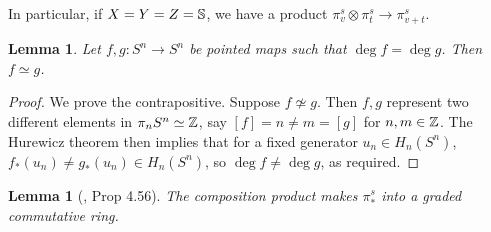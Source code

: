 \documentclass[11pt, titlepage]{article} %
\def\bb{\ensuremath\mathbb}
\def\inte{\ensuremath\mathbb{Z}}
\numberwithin{equation}{subsection}
\theoremstyle{plain}
\newtheorem{lemma}[theorem]{Lemma}
\theoremstyle{definition}
\begin{document}
In particular, if \(X=Y=Z=\bb{S}\), we have a product \(\pi_v^s\otimes \pi_t^s\to \pi_{v+t}^s\).

\begin{lemma}\label{2504281107}
Let \(f, g : S^n \to S^n\) be pointed maps such that \(\deg f = \deg g\). Then \(f \simeq g\). 
\end{lemma}

\begin{proof}
We prove the contrapositive. Suppose \(f \not\simeq g\). Then \(f, g\) represent two different elements in \(\pi_nS^n \simeq \inte\), say \([f]=n\neq m=[g]\) for \(n, m \in \inte\). The Hurewicz theorem then implies that for a fixed generator \(u_n \in H_n(S^n)\), \(f_*(u_n)\neq g_*(u_n)\in H_n(S^n)\), so \(\deg f \neq \deg g\), as required.
\end{proof}

\begin{lemma}[{\autocite{hatcher}, Prop 4.56}]
The composition product makes \(\pi_*^s\) into a graded commutative ring. 
\end{lemma}
\end{document}
